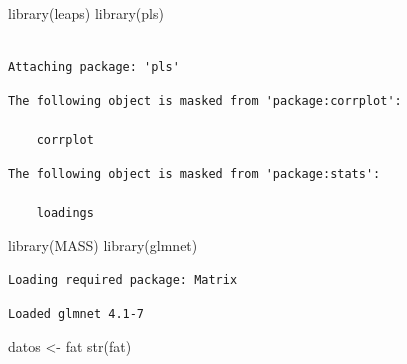 \documentclass[
  letterpaper,
  DIV=11,
  numbers=noendperiod]{scrartcl}
\newenvironment{Shaded}{\begin{snugshade}}{\end{snugshade}}
\newcommand{\FunctionTok}[1]{\textcolor[rgb]{0.28,0.35,0.67}{#1}}
\newcommand{\NormalTok}[1]{\textcolor[rgb]{0.00,0.23,0.31}{#1}}
\newcommand{\OtherTok}[1]{\textcolor[rgb]{0.00,0.23,0.31}{#1}}
\begin{document}
\begin{Shaded}
\begin{Highlighting}[]
\FunctionTok{library}\NormalTok{(leaps)}
\FunctionTok{library}\NormalTok{(pls)}
\end{Highlighting}
\end{Shaded}

\begin{verbatim}

Attaching package: 'pls'
\end{verbatim}

\begin{verbatim}
The following object is masked from 'package:corrplot':

    corrplot
\end{verbatim}

\begin{verbatim}
The following object is masked from 'package:stats':

    loadings
\end{verbatim}

\begin{Shaded}
\begin{Highlighting}[]
\FunctionTok{library}\NormalTok{(MASS)}
\FunctionTok{library}\NormalTok{(glmnet)}
\end{Highlighting}
\end{Shaded}

\begin{verbatim}
Loading required package: Matrix
\end{verbatim}

\begin{verbatim}
Loaded glmnet 4.1-7
\end{verbatim}

\begin{Shaded}
\begin{Highlighting}[]
\NormalTok{datos }\OtherTok{\textless{}{-}}\NormalTok{ fat}
\FunctionTok{str}\NormalTok{(fat)}
\end{Highlighting}
\end{Shaded}
\end{document}
